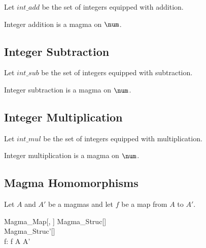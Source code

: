 \documentclass{amsart}
\begin{document}
Let $int\_add$ be the set of integers equipped with addition.

\begin{example}
Integer addition is a magma on $\num$.
\end{example}

\subsection{Integer Subtraction}

Let $int\_sub$ be the set of integers equipped with subtraction.

\begin{example}
Integer subtraction is a magma on $\num$.
\end{example}

\subsection{Integer Multiplication}

Let $int\_mul$ be the set of integers equipped with multiplication.

\begin{example}
Integer multiplication is a magma on $\num$.
\end{example}

\subsection{Magma Homomorphisms}

Let $A$ and $A'$ be a magmas and let $f$ be a map from $A$ to $A'$.

\begin{schema}{Magma\_Map}[\genT, \genU]
	Magma\_Struc[\genT] \\
	Magma\_Struc'[\genU] \\
	f: \genT \pfun \genU
\where
	f \in A \fun A'
\end{schema}
\end{document}
